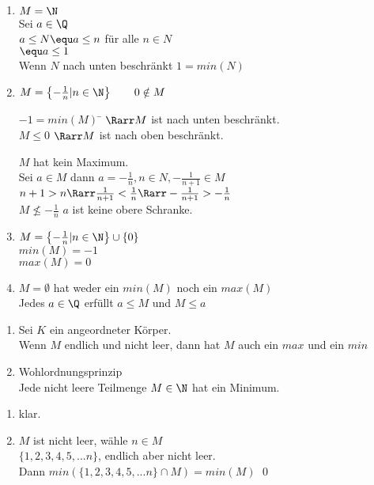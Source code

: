 	\begin{enumerate}
	\item{$M = \N$\\
	Sei $a \in \Q$\\
	$a \leq N \equ a \leq n$ für alle $n \in N$\\
	\phantom{$a \leq \N $} $\equ a \leq 1$\\
	Wenn $N$ nach unten beschränkt $1 = min(N)$}
	\item{$M = \left\lbrace -\frac{1}{n} | n \in \N \right\rbrace \qquad 0 \notin M$\\
	\begin{tabbing}
	$-1 = min(M)$ \= $\Rarr M$ ist nach unten beschränkt.\\
	$M \leq 0$	\> $\Rarr M$ ist nach oben beschränkt.\\
	\end{tabbing}
	$M$ hat kein Maximum.\\
	Sei $a \in M$ dann $a = -\frac{1}{n}, n \in N, -\frac{1}{n + 1} \in M$\\
	$n + 1 > n \Rarr \frac{1}{n + 1} < \frac{1}{n} \Rarr -\frac{1}{n + 1} > -\frac{1}{n}$\\
	$M \nleq -\frac{1}{n}$ $a$ ist keine obere Schranke.}
	\item{$M = \left\lbrace -\frac{1}{n} | n \in \N\right\rbrace \cup \{ 0 \}$\\
	$min(M) = -1$\\
	$max(M) = 0$}
	\item{$M = \emptyset$ hat weder ein $min(M)$ noch ein $max(M)$\\
	Jedes $a \in \Q$ erfüllt $a \leq M$ und $M \leq a$}
	\end{enumerate}
	\begin{enumerate}
	\item{Sei $K$ ein angeordneter Körper.\\
	Wenn $M$ endlich und nicht leer, dann hat $M$ auch ein $max$ und ein $min$}
	\item{Wohlordnungsprinzip\\
	Jede nicht leere Teilmenge $M \in \N$ hat ein Minimum.}
	\end{enumerate}
\bew
	\begin{enumerate}
	\item{klar.}
	\item{$M$ ist nicht leer, wähle $n \in M$\\
	$\{1, 2, 3, 4, 5, ... n\}$, endlich aber nicht leer.\\
	Dann $min(\{1, 2, 3, 4, 5, ... n\} \cap M) = min(M)$ \qed}
	\end{enumerate}
